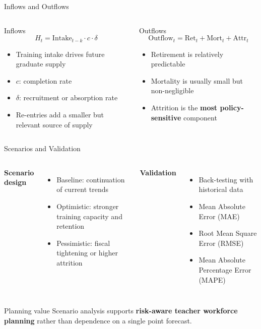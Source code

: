 \documentclass[aspectratio=169,11pt]{beamer}
\newcommand{\highlight}[1]{\textcolor{DavidsonBlueDark}{\textbf{#1}}}
\newcommand{\gold}[1]{\textcolor{AccentGold}{\textbf{#1}}}
\begin{document}
\begin{frame}{Inflows and Outflows}
\begin{columns}[T,onlytextwidth]
\begin{block}{Inflows}
\[
H_t = \mathrm{Intake}_{t-k}\cdot c \cdot \delta
\]
\begin{itemize}
  \item Training intake drives future graduate supply
  \item $c$: completion rate
  \item $\delta$: recruitment or absorption rate
  \item Re-entries add a smaller but relevant source of supply
\end{itemize}
\end{block}
\begin{block}{Outflows}
\[
\mathrm{Outflow}_t = \mathrm{Ret}_t + \mathrm{Mort}_t + \mathrm{Attr}_t
\]
\begin{itemize}
  \item Retirement is relatively predictable
  \item Mortality is usually small but non-negligible
  \item Attrition is the \gold{most policy-sensitive} component
\end{itemize}
\end{block}
\end{columns}
\end{frame}

\begin{frame}{Scenarios and Validation}
\begin{columns}[T,onlytextwidth]
\textbf{Scenario design}
\begin{itemize}
  \item Baseline: continuation of current trends
  \item Optimistic: stronger training capacity and retention
  \item Pessimistic: fiscal tightening or higher attrition
\end{itemize}
\textbf{Validation}
\begin{itemize}
  \item Back-testing with historical data
  \item Mean Absolute Error (MAE)
  \item Root Mean Square Error (RMSE)
  \item Mean Absolute Percentage Error (MAPE)
\end{itemize}
\end{columns}
\vspace{0.2cm}
\begin{block}{Planning value}
Scenario analysis supports \highlight{risk-aware teacher workforce planning} rather than dependence on a single point forecast.
\end{block}
\end{frame}
\end{document}
